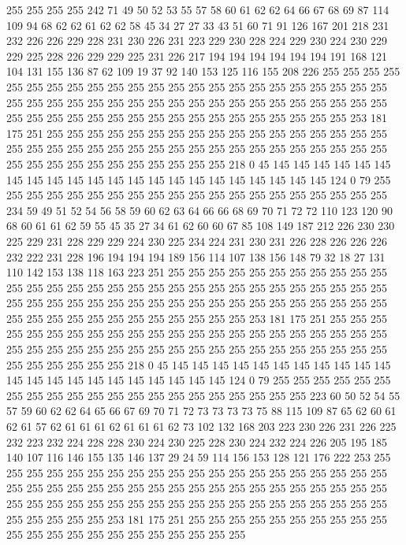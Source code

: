 255 255 255 255 242 71 49 50 52 53 55 57 58 60 61 62 62 64 66 67
68 69 87 114 109 94 68 62 62 61 62 62 58 45 34 27 27 33 43 51
60 71 91 126 167 201 218 231 232 226 226 229 228 231 230 226 231 223 229 230
228 224 229 230 224 230 229 229 225 228 226 229 229 225 231 226 217 194 194 194
194 194 194 191 168 121 104 131 155 136 87 62 109 19 37 92 140 153 125 116
155 208 226 255 255 255 255 255 255 255 255 255 255 255 255 255 255 255 255 255
255 255 255 255 255 255 255 255 255 255 255 255 255 255 255 255 255 255 255 255
255 255 255 255 255 255 255 255 255 255 255 255 255 255 255 255 255 255 255 255
255 255 253 181 175 251 255 255 255 255 255 255 255 255 255 255 255 255 255 255
255 255 255 255 255 255 255 255 255 255 255 255 255 255 255 255 255 255 255 255
255 255 255 255 255 255 255 255 255 255 255 255 255 218 0 45 145 145 145 145
145 145 145 145 145 145 145 145 145 145 145 145 145 145 145 145 145 145 124 0
79 255 255 255 255 255 255 255 255 255 255 255 255 255 255 255 255 255 255 255
255 234 59 49 51 52 54 56 58 59 60 62 63 64 66 66 68 69 70 71
72 72 110 123 120 90 68 60 61 61 62 59 55 45 35 27 34 61 62 60
60 67 85 108 149 187 212 226 230 230 225 229 231 228 229 229 224 230 225 234
224 231 230 231 226 228 226 226 226 232 222 231 228 196 194 194 194 189 156 114
107 138 156 148 79 32 18 27 131 110 142 153 138 118 163 223 251 255 255 255
255 255 255 255 255 255 255 255 255 255 255 255 255 255 255 255 255 255 255 255
255 255 255 255 255 255 255 255 255 255 255 255 255 255 255 255 255 255 255 255
255 255 255 255 255 255 255 255 255 255 255 255 255 255 255 255 255 255 253 181
175 251 255 255 255 255 255 255 255 255 255 255 255 255 255 255 255 255 255 255
255 255 255 255 255 255 255 255 255 255 255 255 255 255 255 255 255 255 255 255
255 255 255 255 255 255 255 255 255 218 0 45 145 145 145 145 145 145 145 145
145 145 145 145 145 145 145 145 145 145 145 145 145 145 124 0 79 255 255 255
255 255 255 255 255 255 255 255 255 255 255 255 255 255 255 255 255 255 223 60
50 52 54 55 57 59 60 62 62 64 65 66 67 69 70 71 72 73 73 73
73 75 88 115 109 87 65 62 60 61 62 61 57 62 61 61 61 62 61 61
61 62 73 102 132 168 203 223 230 226 231 226 225 232 223 232 224 228 228 230
224 230 225 228 230 224 232 224 226 205 195 185 140 107 116 146 155 135 146 137
29 24 59 114 156 153 128 121 176 222 253 255 255 255 255 255 255 255 255 255
255 255 255 255 255 255 255 255 255 255 255 255 255 255 255 255 255 255 255 255
255 255 255 255 255 255 255 255 255 255 255 255 255 255 255 255 255 255 255 255
255 255 255 255 255 255 255 255 255 255 255 255 255 255 253 181 175 251 255 255
255 255 255 255 255 255 255 255 255 255 255 255 255 255 255 255 255 255 255 255
